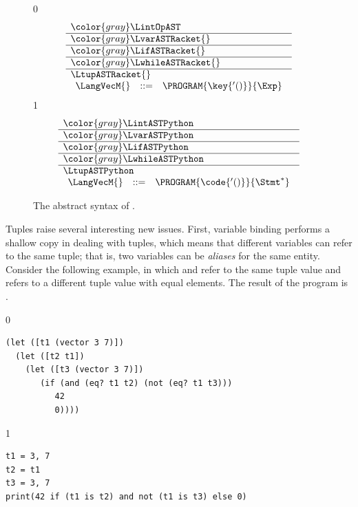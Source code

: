\documentclass[7x10]{TimesAPriori_MIT}%
\newcommand{\gray}[1]{{\color{gray} #1}}
\def\racketEd{0}
\def\pythonEd{1}
\def\edition{1}
\newcommand{\pythonColor}[0]{}
\numberwithin{theorem}{chapter}
\numberwithin{definition}{chapter}
\numberwithin{equation}{chapter}
\begin{document}
\begin{figure}[tp]
\centering
\begin{tcolorbox}[colback=white]
    \small
{\if\edition\racketEd    
\[
\begin{array}{l}
  \gray{\LintOpAST} \\ \hline
  \gray{\LvarASTRacket{}} \\ \hline
  \gray{\LifASTRacket{}} \\ \hline
  \gray{\LwhileASTRacket{}} \\ \hline
  \LtupASTRacket{} \\
\begin{array}{lcl}
  \LangVecM{} &::=& \PROGRAM{\key{'()}}{\Exp}
\end{array}
\end{array}
\]
\fi}
{\if\edition\pythonEd\pythonColor
\[
\begin{array}{l}
  \gray{\LintASTPython} \\ \hline
  \gray{\LvarASTPython} \\ \hline
  \gray{\LifASTPython} \\ \hline
  \gray{\LwhileASTPython} \\ \hline
  \LtupASTPython \\
  \begin{array}{lcl}
    \LangVecM{} &::=& \PROGRAM{\code{'()}}{\Stmt^{*}}
  \end{array}
\end{array}
\]
\fi}
\end{tcolorbox}

\caption{The abstract syntax of \LangVec{}.}
\label{fig:Lvec-syntax}
\end{figure}

Tuples raise several interesting new issues.  First, variable binding
performs a shallow copy in dealing with tuples, which means that
different variables can refer to the same tuple; that is, two
variables can be \emph{aliases} for the same
entity. Consider the following example, in which  and
 refer to the same tuple value and  refers to a
different tuple value with equal elements. The result of the
program is .


\begin{center}
\begin{minipage}{0.96\textwidth}
{\if\edition\racketEd        
\begin{lstlisting}
(let ([t1 (vector 3 7)])
  (let ([t2 t1])
    (let ([t3 (vector 3 7)])
       (if (and (eq? t1 t2) (not (eq? t1 t3)))
          42
          0))))
\end{lstlisting}
\fi}
{\if\edition\pythonEd\pythonColor
\begin{lstlisting}
t1 = 3, 7
t2 = t1
t3 = 3, 7
print(42 if (t1 is t2) and not (t1 is t3) else 0)
\end{lstlisting}
\fi}
\end{minipage}
\end{center}
\end{document}
